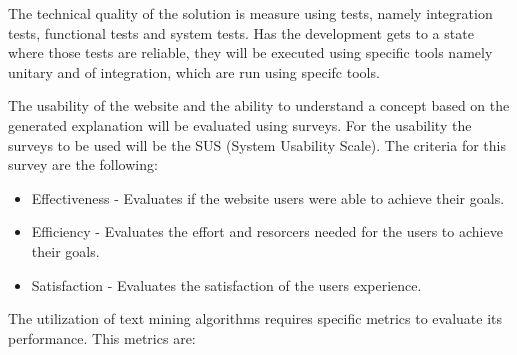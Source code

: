 The technical quality of the solution is measure using tests, namely integration tests, functional tests and system tests.
Has the development gets to a state where those tests are reliable, they will be executed using specific tools  namely unitary and of integration, which are run using specifc tools.

The usability of the website and the ability to understand a concept based on the generated explanation will be evaluated using surveys.
For the usability the surveys to be used will be the SUS (System Usability Scale).
The criteria for this survey are the following:

\begin{itemize}
    \item Effectiveness - Evaluates if the website users were able to achieve their goals.
    \item Efficiency - Evaluates the effort and resorcers needed for the users to achieve their goals.
    \item Satisfaction - Evaluates the satisfaction of the users experience.
\end{itemize}

The utilization of text mining algorithms requires specific metrics to evaluate its performance.
This metrics are: 

